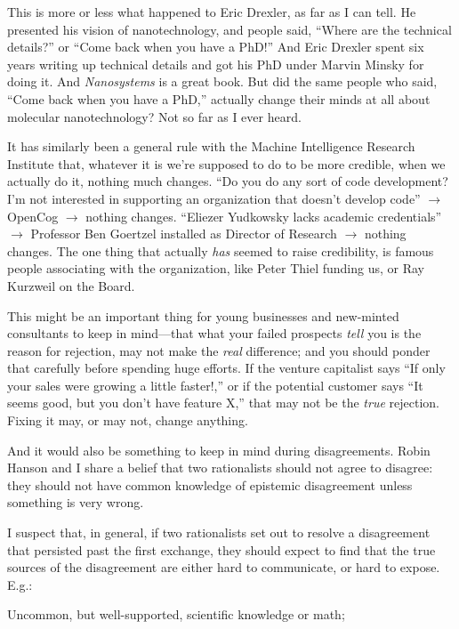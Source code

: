{
 This is more or less what happened to Eric Drexler, as far as I
can tell. He presented his vision of nanotechnology, and people said,
``Where are the technical details?''
or ``Come back when you have a
PhD!'' And Eric Drexler spent six years writing up
technical details and got his PhD under Marvin Minsky for doing it. And
\textit{Nanosystems} is a great book. But did the same people who said,
``Come back when you have a PhD,''
actually change their minds at all about molecular nanotechnology? Not
so far as I ever heard.}

{
 It has similarly been a general rule with the Machine Intelligence
Research Institute that, whatever it is we're supposed
to do to be more credible, when we actually do it, nothing much
changes. ``Do you do any sort of code development?
I'm not interested in supporting an organization that
doesn't develop code'' $\rightarrow $
OpenCog $\rightarrow $ nothing changes. ``Eliezer
Yudkowsky lacks academic credentials'' $\rightarrow $
Professor Ben Goertzel installed as Director of Research $\rightarrow $
nothing changes. The one thing that actually \textit{has} seemed to
raise credibility, is famous people associating with the organization,
like Peter Thiel funding us, or Ray Kurzweil on the Board.}

{
 This might be an important thing for young businesses and
new-minted consultants to keep in mind---that what your failed
prospects \textit{tell} you is the reason for rejection, may not make
the \textit{real} difference; and you should ponder that carefully
before spending huge efforts. If the venture capitalist says
``If only your sales were growing a little
faster!,'' or if the potential customer says
``It seems good, but you don't have
feature X,'' that may not be the \textit{true}
rejection. Fixing it may, or may not, change anything.}

{
 And it would also be something to keep in mind during
disagreements. Robin Hanson and I share a belief that two rationalists
should not agree to disagree: they should not have common knowledge of
epistemic disagreement unless something is very wrong.}

{
 I suspect that, in general, if two rationalists set out to resolve
a disagreement that persisted past the first exchange, they should
expect to find that the true sources of the disagreement are either
hard to communicate, or hard to expose. E.g.:}

{
 Uncommon, but well-supported, scientific knowledge or math;}

